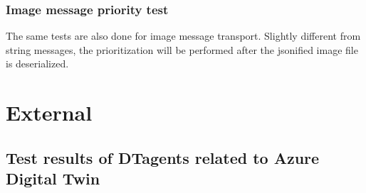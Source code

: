 \subsubsection{Image message priority test}
The same tests are also done for image message transport. Slightly different 
from string messages, the prioritization will be performed after the jsonified 
image file is deserialized.
\section{External}\label{chap: Result-External}

\subsection{Test results of DTagents related to Azure Digital Twin} \label{chap: Result-DT}